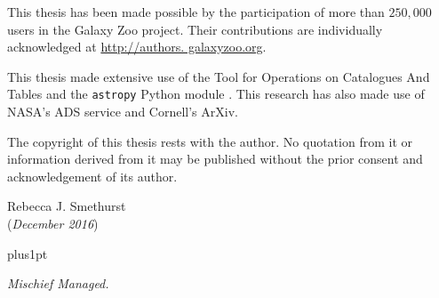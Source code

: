 \documentclass[12pt,useAMS]{ociamthesis}  %
\begin{document}
\begin{originality}
This thesis has been made possible by the participation of more than $250,000$ users in the Galaxy Zoo project. Their contributions are individually acknowledged at \url{http://authors. galaxyzoo.org}.

This thesis made extensive use of the Tool for Operations on Catalogues And Tables \citep[TOPCAT;][]{taylor05} and the {\tt astropy} Python module \citep{astropy13}. This research has also made use of NASA's ADS service and Cornell's ArXiv.

The copyright of this thesis rests with the author. No quotation from it or information derived from it may be published without the prior consent and acknowledgement of its author. 

\begin{flushright}
Rebecca J. Smethurst
\\
(\emph{December 2016})
\end{flushright}


\end{originality}

\begin{acknowledgements}


\end{acknowledgements}

\begin{romanpages}          %
\tableofcontents            %
\listoffigures              %
\end{romanpages}            %


\baselineskip=18pt plus1pt
\linespread{1.2}
 \setlength{\parskip}{1em}
 






%




\newpage
\vspace*{3cm}

\begin{center}

\emph{Mischief Managed.}
\end{center}
\end{document}
